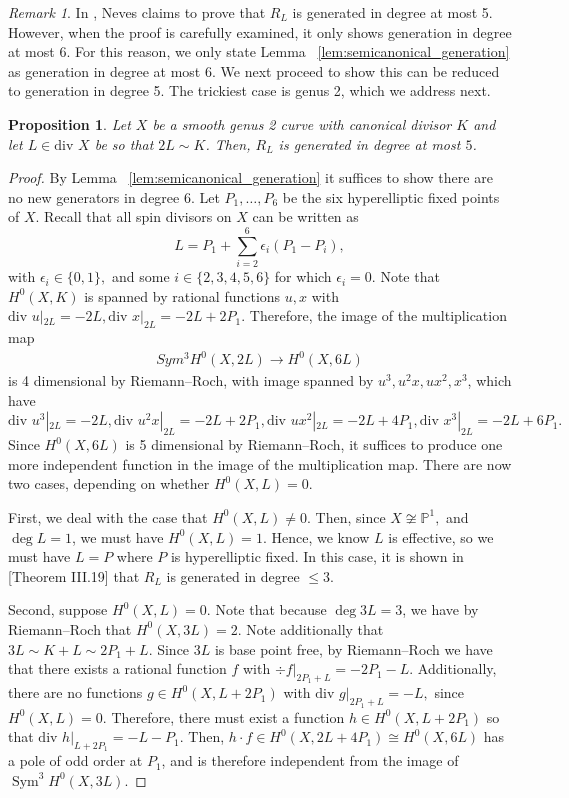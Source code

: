\documentclass{amsart}
\theoremstyle{plain}
\newtheorem{prop}[thm]{Proposition}
\theoremstyle{definition}
\theoremstyle{remark}
\newtheorem{rem}[thm]{Remark}
\numberwithin{equation}{section}
\newcommand\BP{{\mathbb P}}
\newcommand \di{\text{div }}
\DeclareMathOperator{\sym}{Sym}
\begin{document}
\begin{rem}
In \cite[Proposition III.4]{neves:halfcan}, Neves claims to prove that $R_L$ is generated in degree at most 5. However, when the proof is carefully examined, it only shows generation in degree at most 6. For this reason, we only state Lemma ~\ref{lem:semicanonical_generation} as generation in degree at most 6. We next proceed to show this can be reduced to generation in degree 5. The trickiest case is genus 2, which we address next.
\end{rem}



\begin{prop}
\label{prop:genus_2_generation_5}
Let $X$ be a smooth genus 2 curve with canonical divisor $K$ and let $L \in \di X$ be so that $2L \sim K$. 
Then, $R_L$ is generated in degree at most $5$.
\end{prop}
\begin{proof}
By Lemma ~\ref{lem:semicanonical_generation} it suffices to show there are no new generators in degree 6.
Let $P_1,\ldots, P_6$ be the six hyperelliptic fixed points of $X$. 
Recall that all spin divisors on $X$ can be written as 
$$L = P_1 + \sum_{i=2}^{6} \epsilon_i (P_1 - P_i),$$ 
with $\epsilon_i \in \{0,1\},$ and some $i \in \{2, 3, 4, 5, 6\}$ for which $\epsilon_i = 0$. 
Note that $H^0(X,K)$ is spanned by rational functions $u,x$ with $\di u|_{2L} = -2L, \di x|_{2L} = -2L + 2P_1.$ Therefore, the image of the multiplication map 
\begin{align*}
	Sym^3 H^0(X,2L) \rightarrow H^0(X,6L)
\end{align*}
is 4 dimensional by Riemann--Roch, with image spanned by $u^3,u^2x,ux^2,x^3$, 
which have $\di u^3|_{2L} = -2L, \di u^2x|_{2L} = -2L + 2P_1,\di ux^2|_{2L} = -2L+4P_1, \di x^3|_{2L} = -2L + 6P_1.$ 
Since $H^0(X,6L)$ is 5 dimensional by Riemann--Roch,
it suffices to produce one more independent function in the image of the multiplication map.
There are now two cases, depending on whether $H^0(X,L) = 0$.

First, we deal with the case that $H^0(X,L) \neq 0$. 
Then, since $X \not \cong \BP^1,$ and $\deg L = 1$, we must have $H^0(X,L) = 1$. Hence, we know $L$ is effective, so we must have $L = P$ where $P$ is hyperelliptic fixed. In this case, it is shown in \cite{neves:halfcan}[Theorem III.19] that $R_L$ is generated in degree $\leq 3$.

Second, suppose $H^0(X,L) = 0$.
Note that because $\deg 3L = 3$, we have by Riemann--Roch that $H^0(X,3L) = 2$. 
Note additionally that $3L \sim K + L \sim 2P_1 + L$. Since $3L$ is base point free, by Riemann--Roch
we have that there exists a rational function $f$ with $\div f|_{2P_1 + L} = -2P_1 - L.$ Additionally, there are no functions $g \in H^0(X,L + 2P_1)$ 
with $\di g|_{2P_1 + L} = -L,$ since $H^0(X,L) = 0.$ Therefore, there must 
exist a function $h \in H^0(X,L+2P_1)$ so that $\di h|_{L + 2P_1} = -L - P_1$.
Then, $h \cdot f \in H^0(X,2L + 4P_1) \cong H^0(X,6L)$ has a pole of odd 
order at $P_1$, and is therefore independent from the image of $\sym^3 H^0(X,3L)$.
\end{proof}
\end{document}
